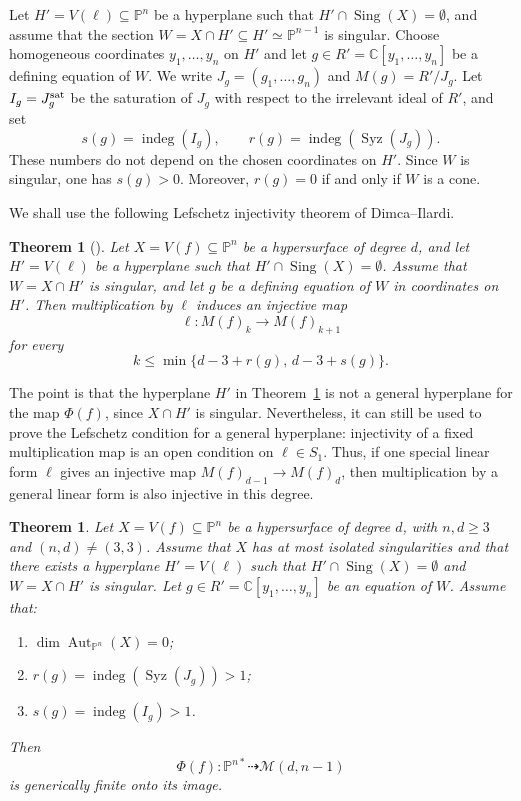 \documentclass[11pt]{amsart}
\theoremstyle{plain}
\newtheorem{thm}[subsection]{Theorem}
\theoremstyle{definition}
\numberwithin{equation}{section}
\newcommand{\M}{{\mathcal M}}
\newcommand{\C}{\mathbb{C}}
\newcommand{\PP}{\mathbb{P}}
\DeclareMathOperator{\Aut}{Aut}
\DeclareMathOperator{\Sing}{Sing}
\begin{document}
Let $H'=V(\ell)\subseteq\PP^n$ be a hyperplane such that
$H'\cap\Sing(X)=\emptyset$, and assume that the section
$W=X\cap H'\subseteq H'\simeq\PP^{n-1}$ is singular. Choose homogeneous
coordinates $y_1,\ldots,y_n$ on $H'$ and let
$g\in R'=\C[y_1,\ldots,y_n]$ be a defining equation of $W$. We write
$J_g=(g_1,\ldots,g_n)$ and $M(g)=R'/J_g$. Let $I_g=J_g^{\rm sat}$ be the
saturation of $J_g$ with respect to the irrelevant ideal of $R'$, and set
\[
s(g)=\operatorname{indeg}(I_g),\qquad
r(g)=\operatorname{indeg}(\operatorname{Syz}(J_g)).
\]
These numbers do not depend on the chosen coordinates on $H'$. Since $W$ is
singular, one has $s(g)>0$. Moreover, $r(g)=0$ if and only if $W$ is a cone.

We shall use the following Lefschetz injectivity theorem of Dimca--Ilardi.

\begin{thm}[{\cite[Theorem~1.11]{DI}}]
\label{thm:DI-injectivity}
Let $X=V(f)\subseteq\PP^n$ be a hypersurface of degree $d$, and let
$H'=V(\ell)$ be a hyperplane such that $H'\cap\Sing(X)=\emptyset$. Assume that
$W=X\cap H'$ is singular, and let $g$ be a defining equation of $W$ in
coordinates on $H'$. Then multiplication by $\ell$ induces an injective map
\[
\ell:M(f)_k\to M(f)_{k+1}
\]
for every
\[
k\leq \min\{d-3+r(g),\,d-3+s(g)\}.
\]
\end{thm}

The point is that the hyperplane $H'$ in Theorem~\ref{thm:DI-injectivity} is not
a general hyperplane for the map $\Phi(f)$, since $X\cap H'$ is singular.
Nevertheless, it can still be used to prove the Lefschetz condition for a general
hyperplane: injectivity of a fixed multiplication map is an open condition on
$\ell\in S_1$. Thus, if one special linear form $\ell$ gives an injective map
$M(f)_{d-1}\to M(f)_d$, then multiplication by a general linear form is also
injective in this degree.

\begin{thm}
\label{thm:singular-section-criterion}
Let $X=V(f)\subseteq\PP^n$ be a hypersurface of degree $d$, with
$n,d\geq3$ and $(n,d)\neq(3,3)$. Assume that $X$ has at most isolated
singularities and that there exists a hyperplane $H'=V(\ell)$ such that
$H'\cap\Sing(X)=\emptyset$ and $W=X\cap H'$ is singular. Let
$g\in R'=\C[y_1,\ldots,y_n]$ be an equation of $W$. Assume that:
\begin{enumerate}
\item $\dim\Aut_{\PP^n}(X)=0$;
\item $r(g)=\operatorname{indeg}(\operatorname{Syz}(J_g))>1$;
\item $s(g)=\operatorname{indeg}(I_g)>1$.
\end{enumerate}
Then
\[
\Phi(f):\PP^{n*}\dashrightarrow \M(d,n-1)
\]
is generically finite onto its image.
\end{thm}
\end{document}

